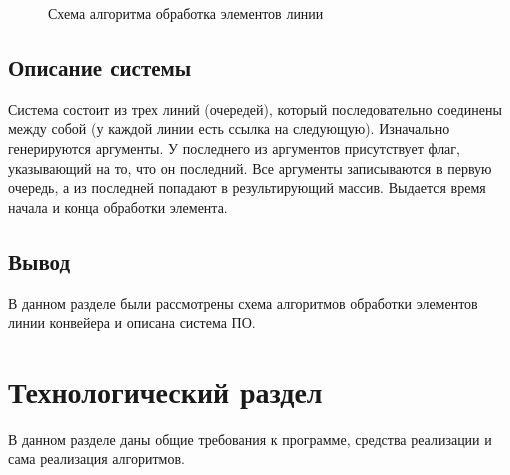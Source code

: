 \documentclass[14pt, a4paper]{extarticle}
\begin{document}
\begin{figure}[h!]\label{Algorithm2}
	\caption{Схема алгоритма обработка элементов линии}
\end{figure}
\subsection{Описание системы}
Система состоит из трех линий (очередей), который последовательно соединены между собой (у каждой линии есть ссылка на следующую). Изначально генерируются аргументы. У последнего из аргументов присутствует флаг, указывающий на то, что он последний. Все аргументы записываются в первую очередь, а из последней попадают в результирующий массив. Выдается время начала и конца обработки элемента.
\subsection{Вывод}
В данном разделе были рассмотрены схема алгоритмов обработки элементов линии конвейера и описана система ПО.
\clearpage
\section{Технологический раздел}
В данном разделе даны общие требования к программе, средства реализации и сама реализация алгоритмов.
\end{document}
